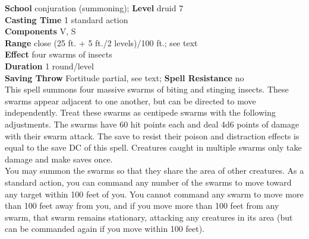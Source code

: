 \textbf{School }conjuration (summoning); \textbf{Level }druid 7\\
\textbf{Casting Time }1 standard action\\
\textbf{Components }V, S\\
\textbf{Range }close (25 ft. + 5 ft./2 levels)/100 ft.; see text\\
\textbf{Effect }four swarms of insects\\
\textbf{Duration }1 round/level\\
\textbf{Saving Throw} Fortitude partial, see text; \textbf{Spell Resistance} no\\
This spell summons four massive swarms of biting and stinging insects. These swarms appear adjacent to one another, but can be directed to move independently. Treat these swarms as centipede swarms with the following adjustments. The swarms have 60 hit points each and deal 4d6 points of damage with their swarm attack. The save to resist their poison and distraction effects is equal to the save DC of this spell. Creatures caught in multiple swarms only take damage and make saves once.\\
You may summon the swarms so that they share the area of other creatures. As a standard action, you can command any number of the swarms to move toward any target within 100 feet of you. You cannot command any swarm to move more than 100 feet away from you, and if you move more than 100 feet from any swarm, that swarm remains stationary, attacking any creatures in its area (but can be commanded again if you move within 100 feet).\\
